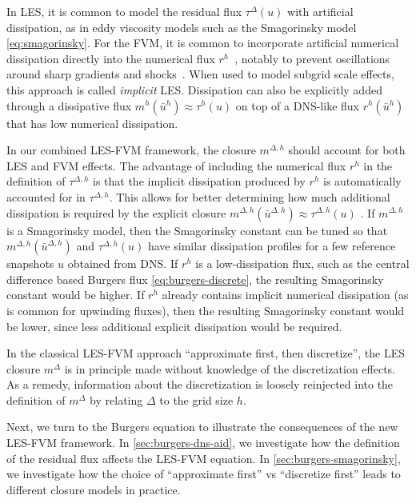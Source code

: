 \documentclass[preprint,twocolumn,5p]{elsarticle}
\begin{document}
In LES, it is common to model the residual flux $\tau^\Delta(u)$
with artificial dissipation, as in eddy viscosity models such as the
Smagorinsky model \eqref{eq:smagorinsky}. For the FVM,
it is common to incorporate artificial numerical dissipation directly into the
numerical flux $r^h$~\cite{dairayNumericalDissipationVs2017},
notably to prevent oscillations around
sharp gradients and shocks~\cite{jamesonConstructionDiscretelyConservative2008}.
When used to model subgrid scale effects, this approach is called
\emph{implicit} LES.
Dissipation can also be explicitly added through a dissipative flux
$m^h(\bar{u}^h) \approx \tau^h(u)$ on top of a
DNS-like flux $r^h(\bar{u}^h)$ that has low numerical dissipation.

In our combined LES-FVM framework,
the closure $m^{\Delta, h}$ should account for both LES and FVM effects.
The advantage of including the numerical flux $r^h$ in the definition of
$\tau^{\Delta, h}$ is that the implicit dissipation produced by $r^h$
is automatically accounted for in $\tau^{\Delta, h}$.
This allows for better determining how much additional dissipation is
required by the explicit closure
$m^{\Delta, h}(\bar{u}^{\Delta, h}) \approx \tau^{\Delta, h}(u)$
\cite{furebyLargeEddySimulation2002}.
If $m^{\Delta, h}$ is a Smagorinsky model, then the Smagorinsky constant can be
tuned so that $m^{\Delta, h}(\bar{u}^{\Delta, h})$ and $\tau^{\Delta, h}(u)$
have similar dissipation profiles for a few reference snapshots $u$ obtained
from DNS.
If $r^h$ is a low-dissipation flux, such as the central difference based
Burgers flux \eqref{eq:burgers-discrete}, the resulting Smagorinsky constant
would be higher.
If $r^h$ already contains implicit numerical dissipation
(as is common for upwinding fluxes), then the resulting Smagorinsky constant
would be lower, since less additional explicit dissipation would be required.

In the classical LES-FVM approach ``approximate first, then discretize'',
the LES closure $m^\Delta$ is in principle made without knowledge of the
discretization effects. As a remedy, information about the discretization is
loosely reinjected into the definition of $m^\Delta$ by relating $\Delta$ to
the grid size $h$.



Next, we turn to the Burgers equation to illustrate the consequences of the new
LES-FVM framework.
In \cref{sec:burgers-dns-aid},
we investigate how the definition of the residual flux affects the LES-FVM
equation. In \cref{sec:burgers-smagorinsky}, we investigate how the choice of
``approximate first'' vs ``discretize first'' leads to different closure
models in practice.
\end{document}
